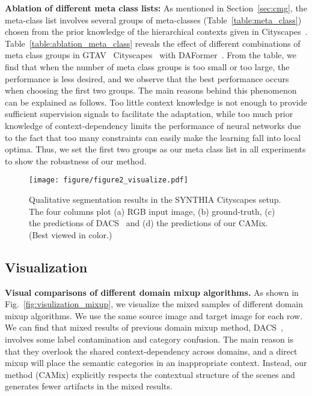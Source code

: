 \documentclass[journal]{IEEEtran}
\begin{document}
{\begin{minipage}{\textwidth}
\noindent \textbf{Ablation of different meta class lists:}
As mentioned in Section~\ref{sec:cmg}, the meta-class list  involves several groups of meta-classes (Table~\ref{table:meta_class}) chosen from the prior knowledge of the hierarchical contexts given in Cityscapes~\cite{cordts2016cityscapes}. Table~\ref{table:ablation_meta_class} reveals the effect of different combinations of meta class groups in GTAV~\cite{stephan2016gtav}  Cityscapes~\cite{cordts2016cityscapes} with DAFormer~\cite{hoyer2022daformer}. From the table, we find that when the number of meta class groups is too small or too large, the performance is
less desired, and we observe that the best performance occurs when choosing the first two groups. The main reasons behind this phenomenon can be explained as follows. Too little context knowledge is not enough to provide sufficient supervision signals to facilitate the adaptation, while too much prior knowledge of context-dependency limits the performance of neural networks due to the fact that too many constraints can easily make the learning fall into local optima. Thus, we set the first two groups as our meta class list  in all experiments to show the robustness of our method.

\begin{figure*}[t]
\centering
\texttt{[image: figure/figure2\_visualize.pdf]}
\caption{Qualitative segmentation results in the SYNTHIA  Cityscapes setup. The four columns plot (a) RGB
input image, (b) ground-truth, (c) the predictions of DACS~\cite{tranheden2020dacs} and (d) the predictions of our CAMix. (Best viewed in color.)
}
\vspace{-3mm}
\label{fig:visualization_segmentation}
\end{figure*}



\subsection{Visualization}
\label{sec:visualization}
\noindent \textbf{Visual comparisons of different domain mixup algorithms.} 
As shown in Fig.~\ref{fig:visulization_mixup}, we visualize the mixed samples of different domain mixup algorithms. We use the same source image and target image for each row. We can find that mixed results of previous domain mixup method, DACS~\cite{tranheden2020dacs}, involves some label contamination and category confusion. The main reason is that they overlook the shared context-dependency across domains, and a direct mixup will place the semantic categories in an inappropriate context. Instead, our method (CAMix) explicitly respects the contextual structure of the scenes and generates fewer artifacts in the mixed results. 



\end{minipage}}
\end{document}
